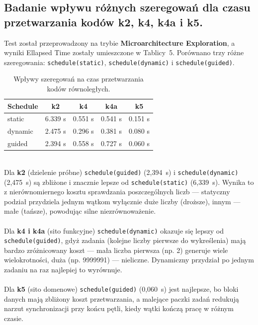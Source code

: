 \documentclass[10pt]{article}
\begin{document}
\subsection*{Badanie wpływu różnych szeregowań dla czasu przetwarzania kodów k2, k4, k4a i k5.}	
Test został przeprowadzony na trybie \textbf{Microarchitecture Exploration}, a wyniki Ellapsed Time
zostały umieszczone w Tablicy~5. Porównano trzy różne szeregowania: \texttt{schedule(static)}, \texttt{schedule(dynamic)} i \texttt{schedule(guided)}.
\\
\begin{table}[h!]
\centering
\begingroup
\begin{tabular}{|l|c|c|c|c|}
\hline
\textbf{Schedule} & \textbf{k2} & \textbf{k4} & \textbf{k4a} & \textbf{k5} \\
\hline
static & 6.339 s & 0.551 s & 0.541 s & 0.151 s \\
\hline
dynamic & 2.475 s & 0.296 s & 0.381 s & 0.080 s \\
\hline
guided &  2.394 s & 0.558 s & 0.727 s & 0.060 s \\
\hline

\end{tabular}%
\endgroup
\caption{Wpływy szeregowań na czas przetwarzania kodów równoległych.}
\end{table}
\\
Dla \textbf{k2} (dzielenie próbne) \texttt{schedule(guided)} (2,394~s) i 
\texttt{schedule(dynamic)} (2,475~s) są zbliżone i znacznie lepsze od 
\texttt{schedule(static)} (6,339~s). Wynika to z nierównomiernego kosztu sprawdzania 
poszczególnych liczb — statyczny podział przydziela jednym wątkom wyłącznie duże liczby 
(droższe), innym — małe (tańsze), powodując silne niezrównoważenie. \\ \\
Dla \textbf{k4 i k4a} (sito funkcyjne) \texttt{schedule(dynamic)} okazuje się lepszy 
od \texttt{schedule(guided)}, gdyż zadania (kolejne liczby pierwsze do wykreślenia) 
mają bardzo zróżnicowany koszt — mała liczba pierwsza (np. 2) generuje wiele 
wielokrotności, duża (np. 9999991) — nieliczne. Dynamiczny przydział po jednym zadaniu 
na raz najlepiej to wyrównuje. \\ \\
Dla \textbf{k5} (sito domenowe) \texttt{schedule(guided)} (0,060~s) jest najlepsze, 
bo bloki danych mają zbliżony koszt przetwarzania, a malejące paczki zadań redukują 
narzut synchronizacji przy końcu pętli, kiedy wątki kończą pracę w różnym czasie.
\end{document}
